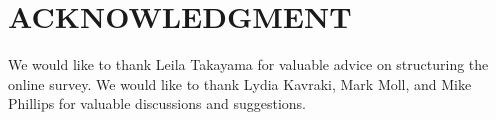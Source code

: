 \documentclass[letterpaper, 10 pt, conference]{ieeeconf}  %
\begin{document}







\section*{ACKNOWLEDGMENT}
We would like to thank Leila Takayama for valuable advice on structuring the online survey. We would like to thank Lydia Kavraki,  Mark Moll, and Mike Phillips for valuable discussions and suggestions. 


\end{document}
